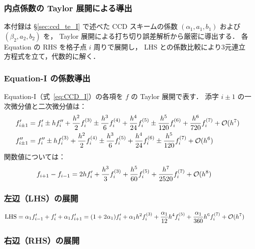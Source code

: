 \subsubsection{内点係数の Taylor 展開による導出}
\label{app:ccd_coef_derivation}

本付録は §\ref{sec:ccd_te_I} で述べた CCD スキームの係数
$(\alpha_1, a_1, b_1)$ および $(\beta_2, a_2, b_2)$ を，
Taylor 展開による打ち切り誤差解析から厳密に導出する．
各 Equation の RHS を格子点 $i$ 周りで展開し，
LHS との係数比較により3元連立方程式を立て，代数的に解く．

\subsubsection{Equation-I の係数導出}
\label{app:ccd_coef_derivation_I}

Equation-I（式~\eqref{eq:CCD_I}）の各項を $f$ の Taylor 展開で表す．
添字 $i\pm1$ の一次微分値と二次微分値は：
\begin{align}
  f'_{i\pm1} &= f'_i \pm hf''_i + \frac{h^2}{2}f^{(3)}_i \pm \frac{h^3}{6}f^{(4)}_i
               + \frac{h^4}{24}f^{(5)}_i \pm \frac{h^5}{120}f^{(6)}_i
               + \frac{h^6}{720}f^{(7)}_i + \mathcal{O}(h^7) \\
  f''_{i\pm1} &= f''_i \pm hf^{(3)}_i + \frac{h^2}{2}f^{(4)}_i \pm \frac{h^3}{6}f^{(5)}_i
                + \frac{h^4}{24}f^{(6)}_i \pm \frac{h^5}{120}f^{(7)}_i + \mathcal{O}(h^6)
\end{align}
関数値については：
\begin{align}
  f_{i+1} - f_{i-1} &= 2hf'_i + \frac{h^3}{3}f^{(3)}_i + \frac{h^5}{60}f^{(5)}_i
                       + \frac{h^7}{2520}f^{(7)}_i + \mathcal{O}(h^8)
\end{align}

\subsubsection*{左辺（LHS）の展開}

\begin{align}
  \text{LHS} &= \alpha_1 f'_{i-1} + f'_i + \alpha_1 f'_{i+1}
  = (1 + 2\alpha_1)f'_i + \alpha_1 h^2 f^{(3)}_i
    + \frac{\alpha_1}{12}h^4 f^{(5)}_i + \frac{\alpha_1}{360}h^6 f^{(7)}_i + \mathcal{O}(h^7)
\end{align}

\subsubsection*{右辺（RHS）の展開}

